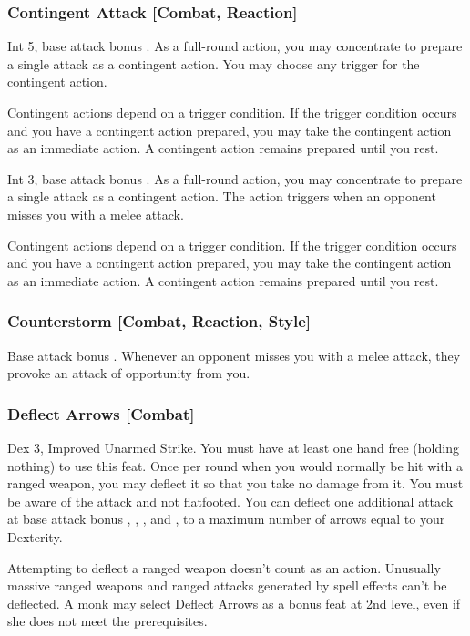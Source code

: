 \subsubsection{Contingent Attack [Combat, Reaction]}
\featpre Int 5, base attack bonus .
\featben As a full-round action, you may concentrate to prepare a single attack as a contingent action. You may choose any trigger for the contingent action.

Contingent actions depend on a trigger condition. If the trigger condition occurs and you have a contingent action prepared, you may take the contingent action as an immediate action. A contingent action remains prepared until you rest.

\featpre Int 3, base attack bonus .
\featben As a full-round action, you may concentrate to prepare a single attack as a contingent action. The action triggers when an opponent misses you with a melee attack.

Contingent actions depend on a trigger condition. If the trigger condition occurs and you have a contingent action prepared, you may take the contingent action as an immediate action. A contingent action remains prepared until you rest.

\subsubsection{Counterstorm [Combat, Reaction, Style]}
\featpre Base attack bonus .
\featben Whenever an opponent misses you with a melee attack, they provoke an attack of opportunity from you.

\subsubsection{Deflect Arrows [Combat]}
 Dex 3, Improved Unarmed Strike.
 You must have at least one hand free (holding nothing) to use this feat. Once per round when you would normally be hit with a ranged weapon, you may deflect it so that you take no damage from it. You must be aware of the attack and not flatfooted. You can deflect one additional attack at base attack bonus , , , and , to a maximum number of arrows equal to your Dexterity.
\par Attempting to deflect a ranged weapon doesn't count as an action. Unusually massive ranged weapons and ranged attacks generated by spell effects can't be deflected.
 A monk may select Deflect Arrows as a bonus feat at 2nd level, even if she does not meet the prerequisites.

